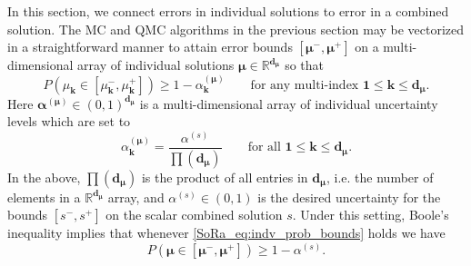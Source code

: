 \documentclass[graybox]{svmult}
\begin{document}
In this section, we connect errors in individual solutions to error in a combined solution. The MC and QMC algorithms in the previous section may be vectorized in a straightforward manner to attain error bounds $[\boldsymbol{\mu}^-,\boldsymbol{\mu}^+]$ on a multi-dimensional array of individual solutions $\boldsymbol{\mu} \in \mathbb{R}^{\boldsymbol{d}_{\boldsymbol{\mu}}}$ so that 
\begin{equation}
    P(\mu_{\boldsymbol{k}} \in [\mu_{\boldsymbol{k}}^-,\mu_{\boldsymbol{k}}^+]) \geq 1-\alpha_{\boldsymbol{k}}^{(\boldsymbol{\mu})}  \qquad \text{for any multi-index }\boldsymbol{1} \leq \boldsymbol{k} \leq \boldsymbol{d}_{\boldsymbol{\mu}}.
    \label{SoRa_eq:indv_prob_bounds}
\end{equation}
Here $\boldsymbol{\alpha}^{(\boldsymbol{\mu})} \in (0,1)^{\boldsymbol{d}_{\boldsymbol{\mu}}}$ is a multi-dimensional array of individual uncertainty levels which are set to 
\begin{equation}
    \alpha_{\boldsymbol{k}}^{(\boldsymbol{\mu})} = \frac{\alpha^{(s)}}{\prod(\boldsymbol{d}_{\boldsymbol{\mu}})}
    \label{SoRa_eq:alpha_mu_from_alpha_s} \qquad \text{for all }\boldsymbol{1} \leq \boldsymbol{k} \leq \boldsymbol{d}_{\boldsymbol{\mu}}.
\end{equation}
In the above, $\prod(\boldsymbol{d}_{\boldsymbol{\mu}})$ is the product of all entries in $\boldsymbol{d}_{\boldsymbol{\mu}}$, i.e. the number of elements in a $\mathbb{R}^{\boldsymbol{d}_{\boldsymbol{\mu}}}$ array, and $\alpha^{(s)} \in (0,1)$ is the desired uncertainty for the bounds $[s^-,s^+]$ on the scalar combined solution $s$. Under this setting, Boole's inequality \cite{boole1847mathematical} implies that whenever \eqref{SoRa_eq:indv_prob_bounds} holds we have
\begin{equation}
    P(\boldsymbol{\mu} \in [\boldsymbol{\mu}^-,\boldsymbol{\mu}^+]) \geq 1-\alpha^{(s)}.
    \label{SoRa_eq:indv_prob_bounds_all}
\end{equation} 
\end{document}
